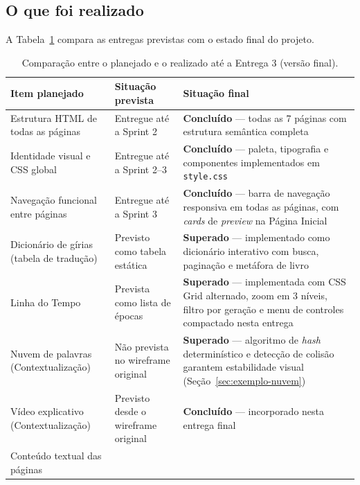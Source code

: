 \documentclass[12pt,a4paper]{article}
\begin{document}
\subsection{O que foi realizado}

A Tabela~\ref{tab:comparacao} compara as entregas previstas com o estado final do projeto.

\begin{table}[H]
\centering
\caption{Comparação entre o planejado e o realizado até a Entrega 3 (versão final).}
\label{tab:comparacao}
\renewcommand{\arraystretch}{1.45}
\begin{tabular}{>{\raggedright}m{3.5cm} >{\raggedright}m{4.5cm} >{\raggedright\arraybackslash}m{4.5cm}}
\toprule
\textbf{Item planejado} & \textbf{Situação prevista} & \textbf{Situação final} \\
\midrule
Estrutura HTML de todas as páginas &
Entregue até a Sprint 2 &
\textcolor{verdeEscuro}{\textbf{Concluído}} — todas as 7 páginas com estrutura semântica
completa \\
\hline
Identidade visual e CSS global &
Entregue até a Sprint 2--3 &
\textcolor{verdeEscuro}{\textbf{Concluído}} — paleta, tipografia e componentes implementados em
\texttt{style.css} \\
\hline
Navegação funcional entre páginas &
Entregue até a Sprint 3 &
\textcolor{verdeEscuro}{\textbf{Concluído}} — barra de navegação responsiva em todas as páginas,
com \textit{cards} de \textit{preview} na Página Inicial \\
\hline
Dicionário de gírias (tabela de tradução) &
Previsto como tabela estática &
\textcolor{verdeEscuro}{\textbf{Superado}} — implementado como dicionário interativo com busca,
paginação e metáfora de livro \\
\hline
Linha do Tempo &
Prevista como lista de épocas &
\textcolor{verdeEscuro}{\textbf{Superado}} — implementada com CSS Grid alternado, zoom em 3
níveis, filtro por geração e menu de controles compactado nesta entrega \\
\hline
Nuvem de palavras (Contextualização) &
Não prevista no wireframe original &
\textcolor{verdeEscuro}{\textbf{Superado}} — algoritmo de \textit{hash} determinístico e
detecção de colisão garantem estabilidade visual (Seção~\ref{sec:exemplo-nuvem}) \\
\hline
Vídeo explicativo (Contextualização) &
Previsto desde o wireframe original &
\textcolor{verdeEscuro}{\textbf{Concluído}} — incorporado nesta entrega final \\
\hline
Conteúdo textual das páginas &

\end{tabular}
\end{table}
\end{document}
